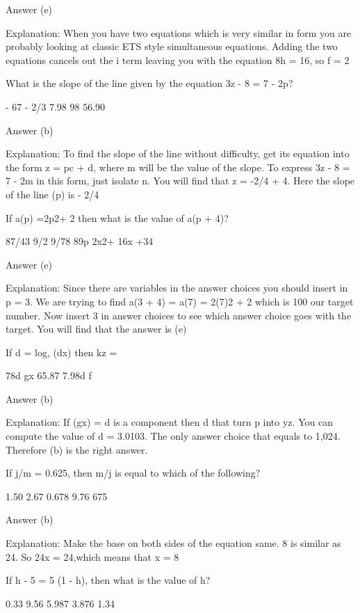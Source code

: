     Answer (e)

    Explanation: When you have two equations which is very similar in form you are probably looking at classic ETS style simultaneous equations. Adding the two equations cancels out the i term leaving you with the equation 8h = 16, so f = 2

    What is the slope of the line given by the equation 3z - 8 = 7 - 2p?

        - 67
        - 2/3
        7.98
        98
        56.90 

    Answer (b)

    Explanation: To find the slope of the line without difficulty, get its equation into the form z = pc + d, where m will be the value of the slope. To express 3z - 8 = 7 - 2m in this form, just isolate n. You will find that z = -2/4 + 4. Here the slope of the line (p) is - 2/4

    If a(p) =2p2+ 2 then what is the value of a(p + 4)?

        87/43
        9/2
        9/78
        89p
        2x2+ 16x +34 

    Answer (e)

    Explanation: Since there are variables in the answer choices you should insert in  p = 3. We are trying to find a(3 + 4) = a(7) = 2(7)2 + 2 which is 100 our target number. Now insert 3 in  answer choices to see which answer choice goes with the target. You will find that the answer is (e)

    If d = log, (dx) then kz =

        78d
        gx
        65.87
        7.98d
        f 

    Answer (b)

    Explanation: If (gx) = d is a component then d that turn p into yz. You can compute the value of d = 3.0103. The only answer choice that equals to 1,024. Therefore (b) is the right answer. 



    If j/m = 0.625, then m/j is equal to which of the following?

        1.50
        2.67
        0.678
        9.76
        675 

    Answer (b)

    Explanation: Make the base on both sides of the equation same. 8 is similar as 24. So 24x  = 24,which means that x = 8

    If h - 5 = 5 (1 - h), then what is the value of h?

        0.33
        9.56
        5.987
        3.876
        1.34 

